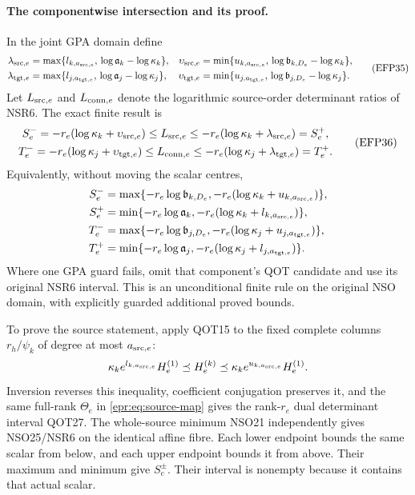 \documentclass[11pt,a4paper]{article}
\begin{document}
\paragraph{The componentwise intersection and its proof.}
In the joint GPA domain define
\begin{equation}
\begin{aligned}
 \lambda_{{\rm src},e}
  &=\max\{l_{k,a_{{\rm src},e}},\,\log\mathfrak a_k-\log\kappa_k\},&
 \upsilon_{{\rm src},e}
  &=\min\{u_{k,a_{{\rm src},e}},\,\log\mathfrak b_{k,D_e}-\log\kappa_k\},\\
 \lambda_{{\rm tgt},e}
  &=\max\{l_{j,a_{{\rm tgt},e}},\,\log\mathfrak a_j-\log\kappa_j\},&
 \upsilon_{{\rm tgt},e}
  &=\min\{u_{j,a_{{\rm tgt},e}},\,\log\mathfrak b_{j,D_e}-\log\kappa_j\}.
\end{aligned}
\tag{EFP35}
\label{epr:eq:centered-intersection}
\end{equation}
Let $L_{{\rm src},e}$ and $L_{{\rm conn},e}$ denote the logarithmic
source-order determinant ratios of NSR6. The exact finite result is
\begin{equation}
\begin{gathered}
 S_e^-=-r_e(\log\kappa_k+\upsilon_{{\rm src},e})
       \le L_{{\rm src},e}
       \le-r_e(\log\kappa_k+\lambda_{{\rm src},e})=S_e^+,\\
 T_e^-=-r_e(\log\kappa_j+\upsilon_{{\rm tgt},e})
       \le L_{{\rm conn},e}
       \le-r_e(\log\kappa_j+\lambda_{{\rm tgt},e})=T_e^+ .
\end{gathered}
\tag{EFP36}
\label{epr:eq:component-intervals}
\end{equation}
Equivalently, without moving the scalar centres,
\[
\begin{split}
 S_e^-&=\max\{-r_e\log\mathfrak b_{k,D_e},
              -r_e(\log\kappa_k+u_{k,a_{{\rm src},e}})\},\\
 S_e^+&=\min\{-r_e\log\mathfrak a_k,
              -r_e(\log\kappa_k+l_{k,a_{{\rm src},e}})\},\\
 T_e^-&=\max\{-r_e\log\mathfrak b_{j,D_e},
              -r_e(\log\kappa_j+u_{j,a_{{\rm tgt},e}})\},\\
 T_e^+&=\min\{-r_e\log\mathfrak a_j,
              -r_e(\log\kappa_j+l_{j,a_{{\rm tgt},e}})\}.
\end{split}
\]
Where one GPA guard fails, omit that component's QOT candidate and use
its original NSR6 interval. This is an unconditional finite rule on the
original NSO domain, with explicitly guarded additional proved bounds.

To prove the source statement, apply QOT15 to the fixed complete
columns $r_h/\psi_k$ of degree at most $a_{{\rm src},e}$:
\[
 \kappa_ke^{l_{k,a_{{\rm src},e}}}H_e^{(1)}
 \preceq H_e^{(k)}
 \preceq \kappa_ke^{u_{k,a_{{\rm src},e}}}H_e^{(1)}.
\]
Inversion reverses this inequality, coefficient conjugation preserves it,
and the same full-rank $\Theta_e$ in \eqref{epr:eq:source-map} gives
the rank-$r_e$ dual determinant interval QOT27.
The whole-source minimum NSO21 independently gives NSO25/NSR6 on the
identical affine fibre. Each lower endpoint bounds the same scalar
from below, and each upper endpoint bounds it from above. Their
maximum and minimum give $S_e^\pm$. Their interval is nonempty
because it contains that actual scalar.
\end{document}
